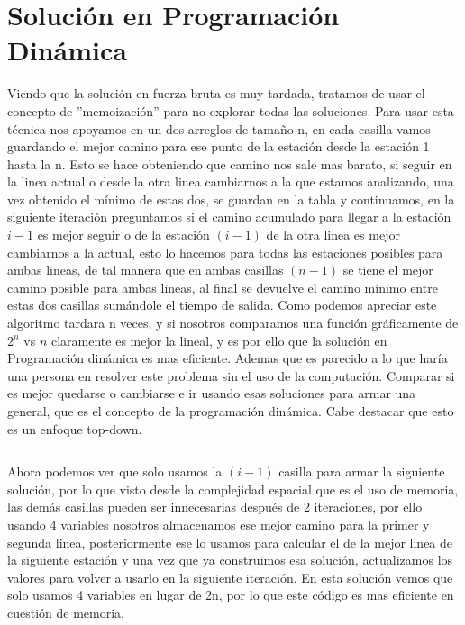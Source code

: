\documentclass[12 pt]{report}
\begin{document}
\section{Solución en Programación Dinámica}
Viendo que la solución en fuerza bruta es muy tardada, tratamos de usar el concepto de ''memoización'' para no explorar todas las soluciones. Para usar esta técnica nos apoyamos en un dos arreglos de tamaño n, en cada casilla vamos guardando el mejor camino para ese punto de la estación desde la estación 1 hasta la n. Esto se hace obteniendo que camino nos sale mas barato, si seguir en la linea actual o desde la otra linea cambiarnos a la que estamos analizando, una vez obtenido el mínimo de estas dos, se guardan en la tabla y continuamos, en la siguiente iteración preguntamos si el camino acumulado para llegar a la estación $i-1$ es mejor seguir o de la estación $(i-1)$ de la otra linea es mejor cambiarnos a la actual, esto lo hacemos para todas las estaciones posibles para ambas lineas, de tal manera que en ambas casillas $(n-1)$ se tiene el mejor camino posible para ambas lineas, al final se devuelve el camino mínimo entre estas dos casillas sumándole el tiempo de salida. Como podemos apreciar este algoritmo tardara n veces, y si nosotros comparamos una función gráficamente de $2^n$ vs $n$ claramente es mejor la lineal, y es por ello que la solución en Programación dinámica es mas eficiente. Ademas que es parecido a lo que haría una persona en resolver este problema sin el uso de la computación. Comparar si es mejor quedarse o cambiarse e ir usando esas soluciones para armar una general, que es el concepto de la programación dinámica. Cabe destacar que esto es un enfoque top-down.

\inputminted[firstline = 26, lastline=37]{C}{../solucionDp1.cpp}

Ahora podemos ver que solo usamos la $(i-1)$ casilla para armar la siguiente solución, por lo que visto desde la complejidad espacial que es el uso de memoria, las demás casillas pueden ser innecesarias después de 2 iteraciones, por ello usando 4 variables nosotros almacenamos ese mejor camino para la primer y segunda linea, posteriormente ese lo usamos para calcular el de la mejor linea de la siguiente estación y una vez que ya construimos esa solución, actualizamos los valores para volver a usarlo en la siguiente iteración. En esta solución vemos que solo usamos 4 variables en lugar de 2n, por lo que este código es mas eficiente en cuestión de memoria.
\inputminted[firstline = 17, lastline=28]{cpp}{../solucionDp2.cpp}
\end{document}
